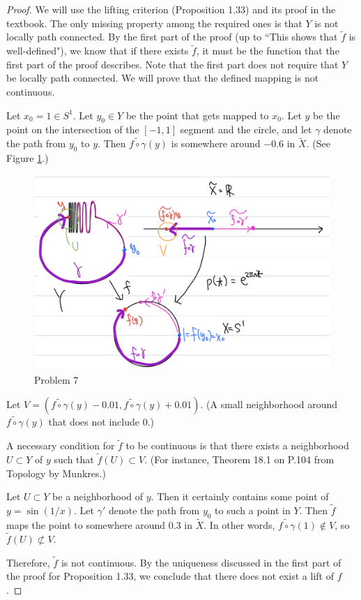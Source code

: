 \documentclass[12pt, psamsfonts]{amsart}
\theoremstyle{definition}
\theoremstyle{remark}
\numberwithin{equation}{section}
\begin{document}
\begin{proof}
  We will use the lifting criterion (Proposition 1.33) and its proof in the textbook.
  The only missing property among the required ones is that $Y$ is not locally path connected.
  By the first part of the proof (up to ``This shows that $\tilde{f}$ is well-defined"), we know that if there exists $\tilde{f}$, it must be the function that the first part of the proof describes.
  Note that the first part does not require that $Y$ be locally path connected.
  We will prove that the defined mapping is not continuous.

  Let $x_0 = 1 \in S^1$.
  Let $y_0 \in Y$ be the point that gets mapped to $x_0$.
  Let $y$ be the point on the intersection of the $[-1, 1]$ segment and the circle, and let $\gamma$ denote the path from $y_0$ to $y$.
  Then $\widetilde{f \circ \gamma}(y)$ is somewhere around $-0.6$ in $\tilde{X}$.
  (See Figure \ref{fig:problem7}.)
  \begin{figure}
    \includegraphics[width=.5\linewidth]{problem7.jpeg}
    \caption{Problem 7}
    \label{fig:problem7}
  \end{figure}
  Let $V = (\widetilde{f \circ \gamma}(y) - 0.01, \widetilde{f \circ \gamma}(y) + 0.01)$.
  (A small neighborhood around $\widetilde{f \circ \gamma}(y)$ that does not include $0$.)

  A necessary condition for $\tilde{f}$ to be continuous is that there exists a neighborhood $U \subset Y$ of $y$ such that $\tilde{f}(U) \subset V$.
  (For instance, Theorem 18.1 on P.104 from Topology by Munkres.)

  Let $U \subset Y$ be a neighborhood of $y$.
  Then it certainly contains some point of $y = \sin (1/x)$.
  Let $\gamma'$ denote the path from $y_0$ to such a point in $Y$.
  Then $\tilde{f}$ maps the point to somewhere around $0.3$ in $\tilde{X}$.
  In other words, $\widetilde{f \circ \gamma}(1) \notin V$, so $\tilde{f}(U) \not\subset V$.

  Therefore, $\tilde{f}$ is not continuous.
  By the uniqueness discussed in the first part of the proof for Proposition 1.33, we conclude that there does not exist a lift of $f$.
\end{proof}
\end{document}
